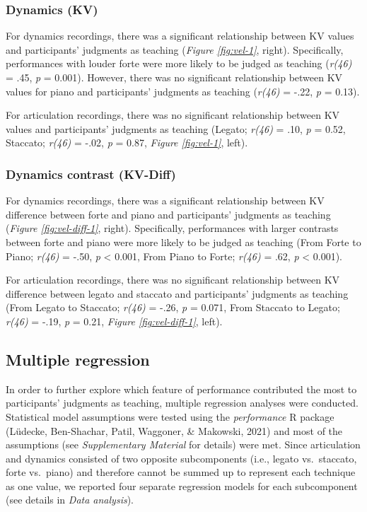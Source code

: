 \documentclass[
  man,floatsintext]{apa6}
\begin{document}
\hypertarget{dynamics-kv}{%
\subsubsection{Dynamics (KV)}\label{dynamics-kv}}

For dynamics recordings, there was a significant relationship between KV values and participants' judgments as teaching (\emph{Figure \ref{fig:vel-1}}, right). Specifically, performances with louder forte were more likely to be judged as teaching (\emph{r(46)} = .45, \emph{p} = 0.001). However, there was no significant relationship between KV values for piano and participants' judgments as teaching (\emph{r(46)} = -.22, \emph{p} = 0.13).

For articulation recordings, there was no significant relationship between KV values and participants' judgments as teaching (Legato; \emph{r(46)} = .10, \emph{p} = 0.52, Staccato; \emph{r(46)} = -.02, \emph{p} = 0.87, \emph{Figure \ref{fig:vel-1}}, left).

\hypertarget{dynamics-contrast-kv-diff}{%
\subsubsection{Dynamics contrast (KV-Diff)}\label{dynamics-contrast-kv-diff}}

For dynamics recordings, there was a significant relationship between KV difference between forte and piano and participants' judgments as teaching (\emph{Figure \ref{fig:vel-diff-1}}, right). Specifically, performances with larger contrasts between forte and piano were more likely to be judged as teaching (From Forte to Piano; \emph{r(46)} = -.50, \emph{p} \textless{} 0.001, From Piano to Forte; \emph{r(46)} = .62, \emph{p} \textless{} 0.001).

For articulation recordings, there was no significant relationship between KV difference between legato and staccato and participants' judgments as teaching (From Legato to Staccato; \emph{r(46)} = -.26, \emph{p} = 0.071, From Staccato to Legato; \emph{r(46)} = -.19, \emph{p} = 0.21, \emph{Figure \ref{fig:vel-diff-1}}, left).

\hypertarget{multiple-regression}{%
\subsection{Multiple regression}\label{multiple-regression}}

In order to further explore which feature of performance contributed the most to participants' judgments as teaching, multiple regression analyses were conducted. Statistical model assumptions were tested using the \emph{performance} R package (Lüdecke, Ben-Shachar, Patil, Waggoner, \& Makowski, 2021) and most of the assumptions (see \emph{Supplementary Material} for details) were met. Since articulation and dynamics consisted of two opposite subcomponents (i.e., legato vs.~staccato, forte vs.~piano) and therefore cannot be summed up to represent each technique as one value, we reported four separate regression models for each subcomponent (see details in \emph{Data analysis}).
\end{document}
